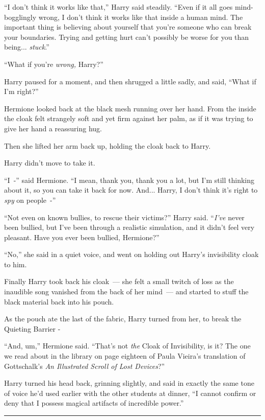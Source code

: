 ``I don't think it works like that,'' Harry said steadily. ``Even if it all goes mind-bogglingly wrong, I don't think it works like that inside a human mind. The important thing is believing about yourself that you're someone who can break your boundaries. Trying and getting hurt can't possibly be worse for you than being... \emph{stuck}.''

``What if you're \emph{wrong,} Harry?''

Harry paused for a moment, and then shrugged a little sadly, and said, ``What if I'm right?''

Hermione looked back at the black mesh running over her hand. From the inside the cloak felt strangely soft and yet firm against her palm, as if it was trying to give her hand a reassuring hug.

Then she lifted her arm back up, holding the cloak back to Harry.

Harry didn't move to take it.

``I~-'' said Hermione. ``I mean, thank you, thank you a lot, but I'm still thinking about it, so you can take it back for now. And... Harry, I don't think it's right to \emph{spy} on people~-''

``Not even on known bullies, to rescue their victims?'' Harry said. ``\emph{I've} never been bullied, but I've been through a realistic simulation, and it didn't feel very pleasant. Have you ever been bullied, Hermione?''

``No,'' she said in a quiet voice, and went on holding out Harry's invisibility cloak to him.

Finally Harry took back his cloak~--- she felt a small twitch of loss as the inaudible song vanished from the back of her mind~--- and started to stuff the black material back into his pouch.

As the pouch ate the last of the fabric, Harry turned from her, to break the Quieting Barrier -

``And, um,'' Hermione said. ``That's not \emph{the} Cloak of Invisibility, is it? The one we read about in the library on page eighteen of Paula Vieira's translation of Gottschalk's \emph{An Illustrated Scroll of Lost Devices}?''

Harry turned his head back, grinning slightly, and said in exactly the same tone of voice he'd used earlier with the other students at dinner, ``I cannot confirm or deny that I possess magical artifacts of incredible power.''

\begin{center}\rule{3in}{0.4pt}\end{center}

